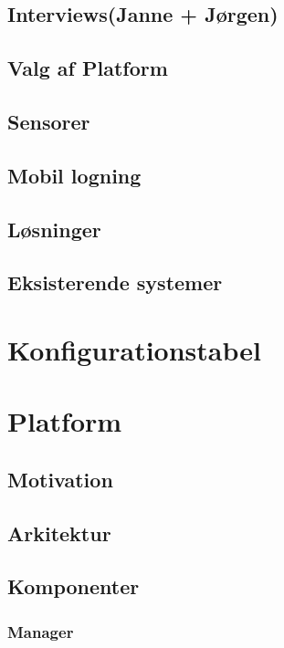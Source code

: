 \section{Interviews(Janne + Jørgen)}




\section{Valg af Platform}


\section{Sensorer}



\section{Mobil logning}

\section{Løsninger}

\section{Eksisterende systemer}


\chapter{Konfigurationstabel}
\chapter{Platform}
\section{Motivation} %
\section{Arkitektur}

\section{Komponenter}
\subsection{Manager}
